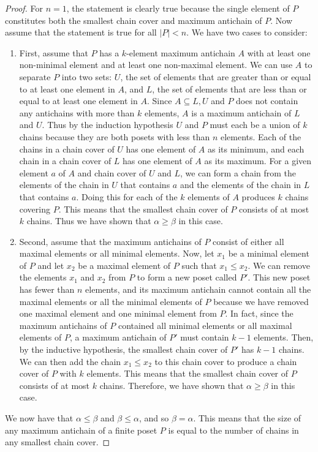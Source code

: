 \documentclass{article} %
\theoremstyle{definition}
\theoremstyle{plain}
\begin{document}
\begin{proof}
For $n=1$, the statement is clearly true because the single element of $P$ constitutes both the smallest chain cover and maximum antichain of $P$. Now assume that the statement is true for all $|P|<n$. We have two cases to consider:
\begin{enumerate}
\item First, assume that $P$ has a $k$-element maximum antichain $A$ with at least one non-minimal element and at least one non-maximal element. We can use $A$ to separate $P$ into two sets: $U$, the set of elements that are greater than or equal to at least one element in $A$, and $L$, the set of elements that are less than or equal to at least one element in $A$. Since $A \subseteq L,U$ and $P$ does not contain any antichains with more than $k$ elements, $A$ is a maximum antichain of $L$ and $U$. Thus by the induction hypothesis $U$ and $P$ must each be a union of $k$ chains because they are both posets with less than $n$ elements. Each of the chains in a chain cover of $U$ has one element of $A$ as its minimum, and each chain in a chain cover of $L$ has one element of $A$ as its maximum. For a given element $a$ of $A$ and chain cover of $U$ and $L$, we can form a chain from the elements of the chain in $U$ that contains $a$ and the elements of the chain in $L$ that contains $a$. Doing this for each of the $k$ elements of $A$ produces $k$ chains covering $P$. This means that the smallest chain cover of $P$ consists of at most $k$ chains. Thus we have shown that $\alpha \geq \beta$ in this case.
\item Second, assume that the maximum antichains of $P$ consist of either all maximal elements or all minimal elements. Now, let $x_1$ be a minimal element of $P$ and let $x_2$ be a maximal element of $P$ such that $x_{1} \leq x_{2}$. We can remove the elements $x_{1}$ and $x_{2}$ from $P$ to form a new poset called $P'$. This new poset has fewer than $n$ elements, and its maximum antichain cannot contain all the maximal elements or all the minimal elements of $P$ because we have removed one maximal element and one minimal element from $P$. In fact, since the maximum antichains of $P$ contained all minimal elements or all maximal elements of $P$, a maximum antichain of $P'$ must contain $k-1$ elements. Then, by the inductive hypothesis, the smallest chain cover of $P'$ has $k-1$ chains. We can then add the chain $x_{1} \leq x_{2}$ to this chain cover to produce a chain cover of $P$ with $k$ elements. This means that the smallest chain cover of $P$ consists of at most $k$ chains. Therefore, we have shown that $\alpha \geq \beta$ in this case.
\end{enumerate}

We now have that $\alpha \leq \beta$ and $\beta \leq \alpha$, and so $\beta=\alpha$. This means that the size of any maximum antichain of a finite poset $P$ is equal to the number of chains in any smallest chain cover.
\end{proof}
\end{document}
